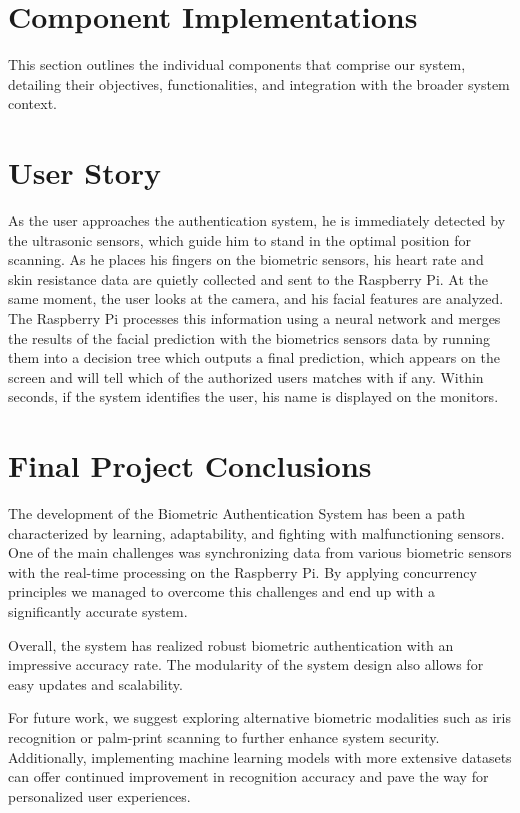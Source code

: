 \documentclass{article}
\begin{document}
\section{Component Implementations}\label{sec:component-implementations} This section outlines the individual
components that comprise our system, detailing their objectives, functionalities,
and integration with the broader system context.






\section{User Story} As the user approaches the authentication system, he is
immediately detected by the ultrasonic sensors, which guide him to stand in the
optimal position for scanning. As he places his fingers on the biometric sensors,
his heart rate and skin resistance data are quietly collected and sent to the
Raspberry Pi. At the same moment, the user looks at the camera, and his facial
features are analyzed. The Raspberry Pi processes this information using
a neural network and merges the results of the facial prediction with the biometrics sensors
data by running them into a decision tree which outputs a final prediction, which appears on the screen
and will tell which of the authorized users matches with if any. Within seconds, if the system identifies the user, 
his name is displayed on the monitors.

\section{Final Project Conclusions} The development of the Biometric
Authentication System has been a path characterized by learning, adaptability,
and fighting with malfunctioning sensors. One of the main challenges was synchronizing data from various
biometric sensors with the real-time processing on the Raspberry Pi.
By applying concurrency principles we managed to overcome this challenges and end up with a significantly accurate system.

Overall, the system has realized robust biometric authentication with an
impressive accuracy rate. The modularity of the system design also allows for
easy updates and scalability.

For future work, we suggest exploring alternative biometric modalities such as
iris recognition or palm-print scanning to further enhance system security.
Additionally, implementing machine learning models with more extensive datasets
can offer continued improvement in recognition accuracy and pave the way for
personalized user experiences.
\end{document}
